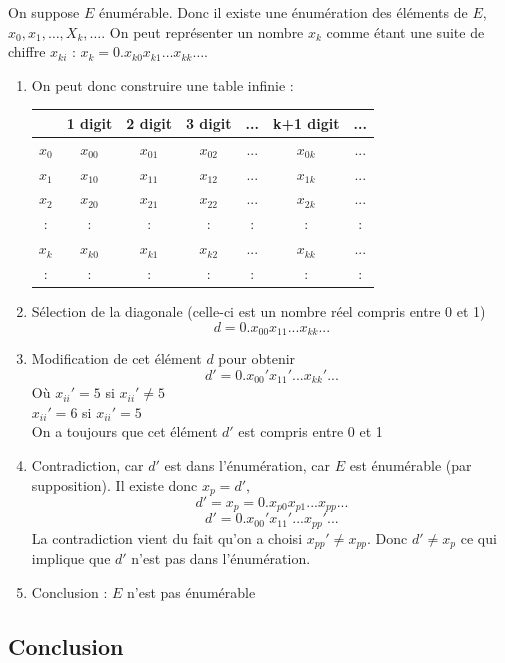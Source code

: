 On suppose $E$ énumérable. Donc il existe une énumération des éléments de $E$,
$x_0, x_1,\dots,X_k,\dots$. On peut représenter un nombre $x_k$ comme étant une
suite de chiffre $x_{ki}$ : $x_k = 0.x_{k0}x_{k1}\dots x_{kk}\dots$.

\begin{enumerate}
	\item On peut donc construire une table infinie : \\
		\begin{tabular}{|c||c|c|c|c|c|c|}
			\hline
			& 1 digit & 2 digit & 3 digit & ... & k+1 digit & ... \\
			\hline
			$x_0$ & $x_{00}$ & $x_{01}$ & $x_{02}$ & ... & $x_{0k}$ & ... \\
			$x_1$ & $x_{10}$ & $x_{11}$ & $x_{12}$ & ... & $x_{1k}$ & ... \\
			$x_2$ & $x_{20}$ & $x_{21}$ & $x_{22}$ & ... & $x_{2k}$ & ... \\
			: & : &:& : & : & : &:\\
			$x_k$ & $x_{k0}$ & $x_{k1}$ & $x_{k2}$ & ... & $x_{kk}$ & ... \\
			: & : &:& : & : & : &:\\
			\hline
		\end{tabular}
	\item Sélection de la diagonale (celle-ci est un nombre réel compris
		entre 0 et 1)
		\[ d=0.x_{00}x_{11}...x_{kk}... \]	
	\item Modification de cet élément $d$ pour obtenir
		\[ d'=0.x_{00}'x_{11}'...x_{kk}'... \]	
		Où $x_{ii}'=5$ si $x_{ii}'\neq 5$ \\
		$x_{ii}'=6$ si $x_{ii}'= 5$ \\
		On a toujours que cet élément $d'$ est compris entre 0 et 1
	\item Contradiction, car $d'$ est dans l'énumération, car $E$ est
		énumérable (par supposition). Il existe donc $x_p=d'$, 
		\[ d'=x_p=0.x_{p0}x_{p1}...x_{pp}... \]	
		\[ d'=0.x_{00}'x_{11}'...x_{pp}'... \]	
		La contradiction vient du fait qu'on a choisi $x_{pp}' \neq
	       	x_{pp}$. Donc $d' \neq x_p$ ce qui implique que $d'$ n'est pas
		dans l'énumération.
	\item Conclusion : $E$ n'est pas énumérable

\end{enumerate}

\subsection{Conclusion}

